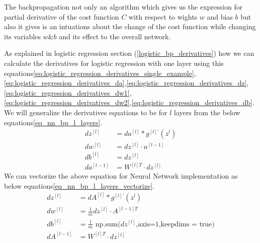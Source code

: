 The backpropagation not only an algorithm which gives us the expression for partial derivative of the cost function $C$ with respect to wights $w$ and bias $b$ but also it gives is an intuations about the change of the cost function while changing its variables $w \& b$ and its effect to the overall network.

As explained in logistic regression section (\ref{logistic_bp_derivatives}) how we can calculate the derivatives for logistic regression with one layer using this equations\eqref{eq:logistic_regression_derivatives_single_example},\eqref{eq:logistic_regression_derivatives_da},\eqref{eq:logistic_regression_derivatives_dz},\\
\eqref{eq:logistic_regression_derivatives_dw1},\eqref{eq:logistic_regression_derivatives_dw2},\eqref{eq:logistic_regression_derivatives_db}.\\
We will generalize the derivatives equations to be for $l$ layers from the below equations\eqref{eq_nn_bp_l_layers}.
 \begin{subequations}\label{eq_nn_bp_l_layers}
   \begin{align}
     dz^{[l]} & = da^{[l]} * g^{[l]'}(z^{l}) \\
     dw^{[l]} & = dz^{[l]} \cdot a^{[l-1]} \\
     db^{[l]} & = dz^{[l]} \\
     da^{[l-1]} & = W^{[l]T} \cdot dz^{[l]} %
 \end{align}
\end{subequations}
We can vectorize the above equation for Neural Network implementation as below equations\eqref{eq_nn_bp_l_layers_vectorize}.
 \begin{subequations}\label{eq_nn_bp_l_layers_vectorize}
   \begin{align}
     dz^{[l]} & = dA^{[l]} * g^{[l]'}(z^{l}) \\
     dw^{[l]} & = \frac{1}{m} dz^{[l]} \cdot A^{[l-1]T} \\
     db^{[l]} & = \frac{1}{m} \text{ np.sum(}dz^{[l]}\text{,axis=1,keepdims = true)} \\
     dA^{[l-1]} & = W^{[l]T} \cdot dz^{[l]} %
 \end{align}
\end{subequations}

